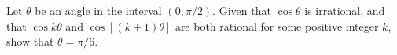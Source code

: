 Let $ \theta$ be an angle in the interval $ (0,\pi/2)$. Given that $ \cos \theta$ is irrational, and that $ \cos k \theta$ and $ \cos[(k + 1)\theta ]$ are both rational for some positive integer $ k$, show that $ \theta = \pi/6$.